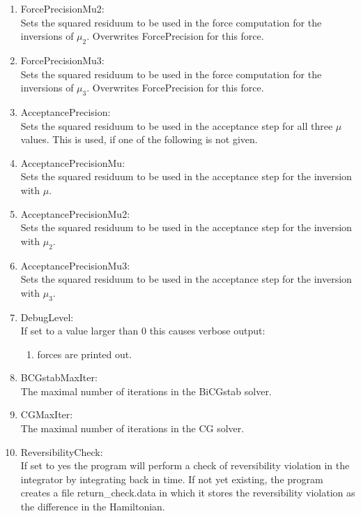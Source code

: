 \begin{enumerate}
\item {\ttfamily ForcePrecisionMu2}:\\
  Sets the squared residuum to be used in the force computation for
  the inversions of $\mu_2$. Overwrites {\ttfamily ForcePrecision}
  for this force.

\item {\ttfamily ForcePrecisionMu3}:\\
  Sets the squared residuum to be used in the force computation for
  the inversions of $\mu_3$. Overwrites {\ttfamily ForcePrecision}
  for this force.

\item {\ttfamily AcceptancePrecision}:\\
  Sets the squared residuum to be used in the acceptance step for
  all three $\mu$ values. This is used, if one of the following is not
  given.

\item {\ttfamily AcceptancePrecisionMu}:\\
  Sets the squared residuum to be used in the acceptance step for
  the inversion with $\mu$.

\item {\ttfamily AcceptancePrecisionMu2}:\\
  Sets the squared residuum to be used in the acceptance step for
  the inversion with $\mu_2$.

\item {\ttfamily AcceptancePrecisionMu3}:\\
  Sets the squared residuum to be used in the acceptance step for
  the inversion with $\mu_3$.

\item {\ttfamily DebugLevel}:\\
  If set to a value larger than $0$ this causes verbose output:
  \begin{enumerate}
  \item forces are printed out.
  \end{enumerate}

\item {\ttfamily BCGstabMaxIter}:\\
  The maximal number of iterations in the BiCGstab solver.

\item {\ttfamily CGMaxIter}:\\
  The maximal number of iterations in the CG solver.

\item {\ttfamily ReversibilityCheck}:\\
  If set to {\ttfamily yes} the program will perform a check of
  reversibility violation in the integrator by integrating back in
  time. If not yet existing, the program creates a file {\ttfamily
    return\_check.data} in which it stores the reversibility violation
  as the difference in the Hamiltonian.


\end{enumerate}
